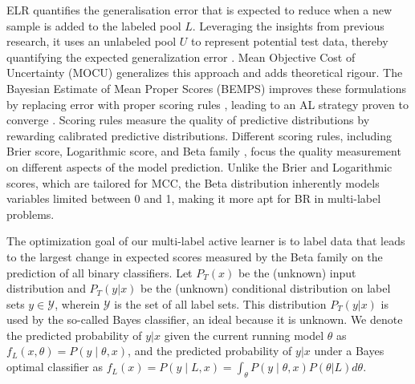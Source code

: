 \documentclass[letterpaper]{article} %
\begin{document}
ELR \citep{roy2001toward} quantifies the generalisation error that is expected to reduce when a new sample is added to the labeled pool $L$.
Leveraging the insights from previous research, it uses an unlabeled pool $U$ to represent potential test data, thereby quantifying the expected generalization error \citep{settles2009active}.
Mean Objective Cost of Uncertainty (MOCU) \cite{zhao2020uncertainty} generalizes this approach and adds theoretical rigour.
The Bayesian Estimate of Mean Proper Scores (BEMPS) improves these formulations by replacing error with proper scoring rules \citep{doi:10.1198/016214506000001437}, leading to an AL strategy proven to converge  \citep{TanDuBun-IEEEPAMI23}.
Scoring rules measure the quality of predictive distributions by rewarding calibrated predictive distributions.
Different scoring rules, including Brier score,
Logarithmic score, and Beta family \cite{doi:10.1198/016214506000001437},
focus the quality measurement on different aspects of the model prediction.
Unlike the Brier and Logarithmic scores, which are tailored for MCC, the Beta distribution inherently models variables limited between 0 and 1, making it more apt for BR in multi-label problems.

The optimization goal of our multi-label active learner is to
label data that
leads to the largest change in expected scores
measured by the Beta family on the prediction of all binary classifiers.
Let $P_T(x)$ be the (unknown) input distribution and
$P_T(y|x)$ be the (unknown) conditional distribution on label sets
$y\in \mathcal{Y}$, wherein $\mathcal{Y}$ is the set of all label sets.
This distribution $P_T(y|x)$ is used by the so-called Bayes classifier, an ideal because it is unknown.
We denote the predicted probability of $y|x$ given the current running model $\theta$ as $f_L(x,\theta)=P(y \mid \theta,x)$,
and
the predicted probability of $y|x$ under a Bayes optimal classifier
as $f_{L}(x)=P(y\mid L,x)=\int_\theta P(y \mid \theta,x) P(\theta|L) d\theta$.
\end{document}
